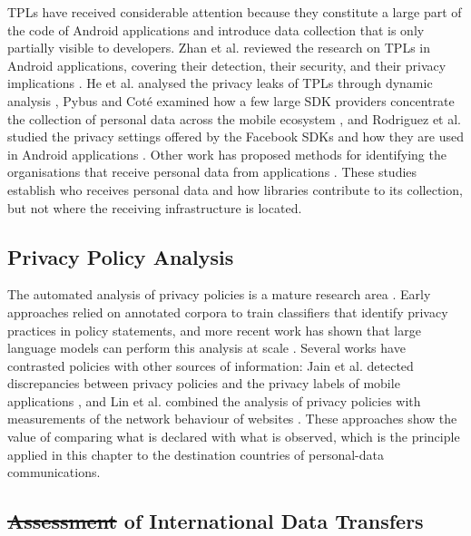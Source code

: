 \documentclass[
A4paper,                %
twoside,                %
openright,              %
chapterprefix=true,     %
12pt,                   %
headings=normal,        %
titlepage=on            %
]{book}
\makeatletter
\providecommand{\DIFaddtex}[1]{{\protect\color{blue}\uwave{#1}}} %
\providecommand{\DIFdeltex}[1]{{\protect\color{red}\sout{#1}}} %
\providecommand{\DIFaddbegin}{} %
\providecommand{\DIFaddend}{} %
\providecommand{\DIFdelbegin}{} %
\providecommand{\DIFdelend}{} %
\providecommand{\DIFadd}[1]{\texorpdfstring{\DIFaddtex{#1}}{#1}} %
\providecommand{\DIFdel}[1]{\texorpdfstring{\DIFdeltex{#1}}{}} %
\providecommand{\DIFscaledelfig}{0.5}
\newlength{\DIFdelgraphicswidth} %
\newlength{\DIFdelgraphicsheight} %
\providecommand{\DIFaddincludegraphics}[2][]{{\color{blue}\fbox{\DIFOincludegraphics[#1]{#2}}}} %
\providecommand{\DIFdelincludegraphics}[2][]{%
\sbox{\DIFdelgraphicsbox}{\DIFOincludegraphics[#1]{#2}}%
\settoboxwidth{\DIFdelgraphicswidth}{\DIFdelgraphicsbox} %
\settoboxtotalheight{\DIFdelgraphicsheight}{\DIFdelgraphicsbox} %
\scalebox{\DIFscaledelfig}{%
\parbox[b]{\DIFdelgraphicswidth}{\usebox{\DIFdelgraphicsbox}\\[-\baselineskip] \rule{\DIFdelgraphicswidth}{0em}}\llap{\resizebox{\DIFdelgraphicswidth}{\DIFdelgraphicsheight}{%
\setlength{\unitlength}{\DIFdelgraphicswidth}%
\begin{picture}(1,1)%
\thicklines\linethickness{2pt} %
{\color[rgb]{1,0,0}\put(0,0){\framebox(1,1){}}}%
{\color[rgb]{1,0,0}\put(0,0){\line( 1,1){1}}}%
{\color[rgb]{1,0,0}\put(0,1){\line(1,-1){1}}}%
\end{picture}%
}\hspace*{3pt}}} %
} %
\DeclareRobustCommand{\DIFaddbegin}{\DIFOaddbegin \let\includegraphics\DIFaddincludegraphics} %
\DeclareRobustCommand{\DIFaddend}{\DIFOaddend \let\includegraphics\DIFOincludegraphics} %
\DeclareRobustCommand{\DIFdelbegin}{\DIFOdelbegin \let\includegraphics\DIFdelincludegraphics} %
\DeclareRobustCommand{\DIFdelend}{\DIFOaddend \let\includegraphics\DIFOincludegraphics} %
\let\sout@orig\sout %
\renewcommand{\sout}[1]{\ifmmode\text{\sout@orig{\ensuremath{#1}}}\else\sout@orig{#1}\fi} %
\makeatother
\begin{document}
TPLs have received considerable attention because they constitute a large part of the code of Android applications \cite{Wang2017UnderstandingAnalysis} and introduce data collection that is only partially visible to developers. Zhan et al. reviewed the research on TPLs in Android applications, covering their detection, their security, and their privacy implications \cite{Zhan2022ResearchReview}. He et al. analysed the privacy leaks of TPLs through dynamic analysis \cite{He2019DynamicLibraries}, Pybus and Cot\'{e} examined how a few large SDK providers concentrate the collection of personal data across the mobile ecosystem \cite{Pybus2024SuperMobile}, and Rodriguez et al. studied the privacy settings offered by the Facebook SDKs and how they are used in Android applications \cite{Rodriguez2025PrivacySDKs}. Other work has proposed methods for identifying the organisations that receive personal data from applications \cite{Rodriguez2024ROI:Data}. These studies establish who receives personal data and how libraries contribute to its collection, but not where the receiving infrastructure is located.

\subsection{Privacy Policy Analysis}
\label{sc:anycast_experiments_sota_policies}

The automated analysis of privacy policies is a mature research area \cite{DelAlamo2022APolicies}. Early approaches relied on annotated corpora to train classifiers that identify privacy practices in policy statements, and more recent work has shown that large language models can perform this analysis at scale \cite{Rodriguez2024LargeScale}. Several works have contrasted policies with other sources of information: Jain et al. detected discrepancies between privacy policies and the privacy labels of mobile applications \cite{Jain2023ATLAS:Labels}, and Lin et al. combined the analysis of privacy policies with measurements of the network behaviour of websites \cite{Lin2022PrivacyPolicies}. These approaches show the value of comparing what is declared with what is observed, which is the principle applied in this chapter to the destination countries of personal-data communications.

\subsection{\DIFdelbegin \DIFdel{Assessment }\DIFdelend \DIFaddbegin \DIFadd{Empirical Studies }\DIFaddend of International Data Transfers}
\label{sc:anycast_experiments_sota_transfers}
\end{document}
